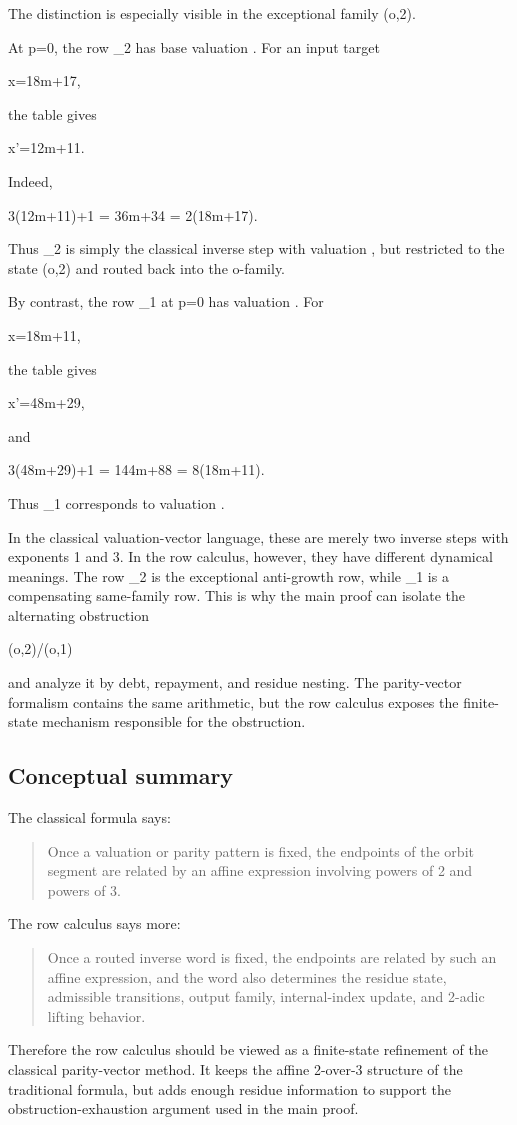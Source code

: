 \documentclass[11pt,letterpaper]{amsart}
\def\mathrm#1{#1}%
\def\({}%
\def\){}%
\def\[{ }%
\def\]{ }%
\theoremstyle{definition}
\theoremstyle{plain}
\theoremstyle{plain}
\theoremstyle{remark}
\begin{document}
The distinction is especially visible in the exceptional family
\((\mathrm o,2)\).

At \(p=0\), the row \(\Omega_2\) has base valuation \(\).  For an
input target
\[
x=18m+17,
\]
the table gives
\[
x'=12m+11.
\]
Indeed,
\[
3(12m+11)+1
=
36m+34
=
2(18m+17).
\]
Thus \(\Omega_2\) is simply the classical inverse step with valuation
\(\), but restricted to the state \((\mathrm o,2)\) and routed
back into the \(\mathrm o\)-family.

By contrast, the row \(\Omega_1\) at \(p=0\) has valuation \(\).
For
\[
x=18m+11,
\]
the table gives
\[
x'=48m+29,
\]
and
\[
3(48m+29)+1
=
144m+88
=
8(18m+11).
\]
Thus \(\Omega_1\) corresponds to valuation \(\).

In the classical valuation-vector language, these are merely two inverse
steps with exponents \(1\) and \(3\).  In the row calculus, however, they
have different dynamical meanings.  The row \(\Omega_2\) is the exceptional
anti-growth row, while \(\Omega_1\) is a compensating same-family row.
This is why the main proof can isolate the alternating obstruction
\[
(o,2)/(o,1)
\]
and analyze it by debt, repayment, and residue nesting.  The parity-vector
formalism contains the same arithmetic, but the row calculus exposes the
finite-state mechanism responsible for the obstruction.

\subsection*{Conceptual summary}

The classical formula says:

\begin{quote}
Once a valuation or parity pattern is fixed, the endpoints of the orbit
segment are related by an affine expression involving powers of \(2\) and
powers of \(3\).
\end{quote}

The row calculus says more:

\begin{quote}
Once a routed inverse word is fixed, the endpoints are related by such an
affine expression, and the word also determines the residue state,
admissible transitions, output family, internal-index update, and
\(2\)-adic lifting behavior.
\end{quote}

Therefore the row calculus should be viewed as a finite-state refinement
of the classical parity-vector method.  It keeps the affine \(2\)-over-\(3\)
structure of the traditional formula, but adds enough residue information
to support the obstruction-exhaustion argument used in the main proof.
\end{document}
